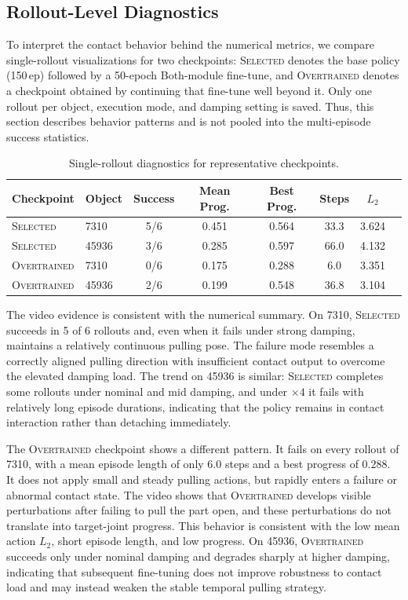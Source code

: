 \documentclass{llmxive}
\begin{document}
\subsection{Rollout-Level Diagnostics}
\label{sec:rollout}

To interpret the contact behavior behind the numerical metrics, we
compare single-rollout visualizations for two checkpoints:
\textsc{Selected} denotes the base policy (150\,ep) followed by a
50-epoch Both-module fine-tune, and \textsc{Overtrained} denotes a
checkpoint obtained by continuing that fine-tune well beyond it. Only one rollout per object, execution mode, and damping
setting is saved. Thus, this section describes behavior patterns and
is not pooled into the multi-episode success statistics.

\begin{table}[!htbp]
\centering
\small
\begin{tabular}{llcccccc}
\toprule
Checkpoint & Object & Success & Mean Prog. & Best Prog. & Steps & $L_2$ \\
\midrule
\textsc{Selected} & 7310  & 5/6 & 0.451 & 0.564 & 33.3 & 3.624 \\
\textsc{Selected} & 45936 & 3/6 & 0.285 & 0.597 & 66.0 & 4.132 \\
\textsc{Overtrained} & 7310  & 0/6 & 0.175 & 0.288 &  6.0 & 3.351 \\
\textsc{Overtrained} & 45936 & 2/6 & 0.199 & 0.548 & 36.8 & 3.104 \\
\bottomrule
\end{tabular}
\caption{Single-rollout diagnostics for representative checkpoints.}
\label{tab:rollout}
\end{table}

The video evidence is consistent with the numerical summary. On
7310, \textsc{Selected} succeeds in 5 of 6 rollouts and, even when it
fails under strong damping, maintains a relatively continuous
pulling pose. The failure mode resembles a correctly aligned pulling
direction with insufficient contact output to overcome the elevated
damping load. The trend on 45936 is similar: \textsc{Selected}
completes some rollouts under nominal and mid damping, and under
$\times4$ it fails with relatively long episode durations, indicating
that the policy remains in contact interaction rather than detaching
immediately.

The \textsc{Overtrained} checkpoint shows a different pattern. It fails
on every rollout of 7310, with a mean episode length of only $6.0$
steps and a best progress of $0.288$. It does not apply small and
steady pulling actions, but rapidly enters a failure or abnormal
contact state. The video shows that \textsc{Overtrained} develops
visible perturbations after failing to pull the part open, and these
perturbations do not translate into target-joint progress. This
behavior is consistent with the low mean action $L_2$, short episode
length, and low progress. On 45936, \textsc{Overtrained} succeeds only
under nominal damping and degrades sharply at higher damping,
indicating that subsequent fine-tuning does not improve robustness
to contact load and may instead weaken the stable temporal pulling
strategy.
\end{document}

